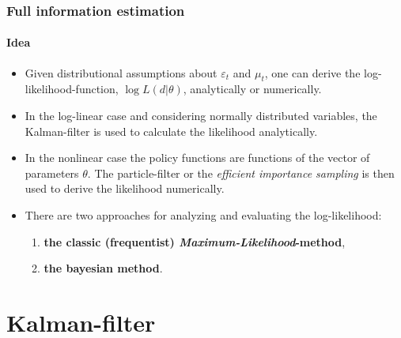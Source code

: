 \documentclass[handout]{beamer}  %
\begin{document}
\begin{frame}\frametitle{Full information estimation}\framesubtitle{Idea}
	\begin{itemize}
		\item Given distributional assumptions about $\varepsilon_t$ and $\mu_t$, one can derive the log-likelihood-function, $\log{L(d|\theta)}$, analytically or numerically.
		\item In the log-linear case and considering normally distributed variables, the Kalman-filter is used to calculate the likelihood analytically.
		\item In the nonlinear case the policy functions are functions of the vector of parameters $\theta$. The particle-filter or the \emph{efficient importance sampling} is then used to derive the likelihood numerically.
		\item There are two approaches for analyzing and evaluating the log-likelihood:
		\begin{enumerate}
			\item \textbf{the classic (frequentist) \emph{Maximum-Likelihood}-method},
			\item \textbf{the bayesian method}.
		\end{enumerate}
	\end{itemize}
\end{frame}

\section{Kalman-filter}
\end{document}
